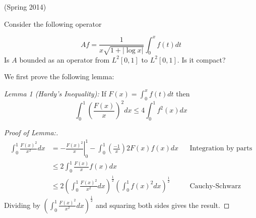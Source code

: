 \documentclass[answers]{exam}
\theoremstyle{problemstyle}
\newcommand{\1}[1]{\textbf{1}_{\left[#1\right]}} %
\begin{document}
\begin{questions}

\question (Spring 2014)

Consider the following operator

\begin{equation*}
  Af = \frac{1}{x \sqrt{1+|\log x|}} \int_{0}^{x}f(t)dt  
\end{equation*}
Is $A$ bounded as an operator from $L^{2}[0,1]$ to $L^{2}[0,1]$. Is it compact?
\begin{solution}
We first prove the following lemma: 

  \textit{Lemma 1 (Hardy's Inequality):} If $F(x)= \int_{0}^{x}f(t)dt$ then
  \begin{equation*}
    \int_{0}^{1}\left( \frac{F(x)}{x} \right)^{2}dx \leq 4 \int_{0}^{1}f^{2}(x)dx
  \end{equation*}
  \begin{proof}[Proof of Lemma:] 
    \begin{align*}
      \int_{0}^{1}\frac{F(x)^{2}}{x^{2}}dx
      &= - \left.\frac{F(x)^{2}}{x}\right|_{0}^{1} - \int_{0}^{1}\left( \frac{-1}{x} \right)2F(x)f(x)dx &&\text{Integration by parts}\\
      &\leq 2 \int_{0}^{1}\frac{F(x)}{x}f(x)dx\\
      &\leq 2 \left(  \int_{0}^{1}\frac{F(x)^{2}}{x^{2}}dx \right)^{\frac{1}{2}} \left( \int_{0}^{1}f(x)^{2}dx \right)^{\frac{1}{2}}&&\text{Cauchy-Schwarz}
    \end{align*}
    Dividing by $ \left(  \int_{0}^{1}\frac{F(x)^{2}}{x^{2}}dx \right)^{\frac{1}{2}}$ and squaring both sides gives the result.
  \end{proof}
  

\end{solution}
\end{questions}
\end{document}
